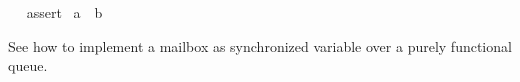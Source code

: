 \begin{isabellebody}
\ \ %
\isaantiq
assert{}%
\endisaantiq
\ {}a\ {}{}\ b{}{}\isanewline
{}%
\endisatagML
{\isafoldML}%
%
\isadelimML
%
\endisadelimML
%
\begin{isamarkuptext}%
\medskip See \hyperlink{file.~~/src/Pure/Concurrent/mailbox.ML}{\mbox{}} how
  to implement a mailbox as synchronized variable over a purely
  functional queue.%
\end{isamarkuptext}%
\isamarkuptrue%
%
\isadelimtheory
%
\endisadelimtheory
%
\isatagtheory
{}\isamarkupfalse%
%
\endisatagtheory
{\isafoldtheory}%
%
\isadelimtheory
%
\endisadelimtheory
\end{isabellebody}%
